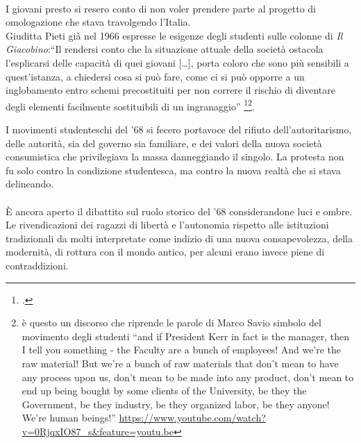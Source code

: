 \paragraph{}I giovani presto si resero conto di non voler prendere parte al progetto di omologazione che stava travolgendo l'Italia.
\\Giuditta Pieti già nel 1966 espresse le esigenze degli studenti sulle colonne di \textit{Il Giacobino}:\enquote{Il rendersi conto che la situazione attuale della società ostacola l’esplicarsi delle capacità di quei giovani […], porta coloro che sono più sensibili a quest'istanza, a chiedersi cosa si può fare, come ci si può opporre a un inglobamento entro schemi precostituiti per non correre il rischio di diventare degli elementi facilmente sostituibili di un ingranaggio} \footcite{Pieti}\footnote{è questo un discorso che riprende le parole di Marco Savio simbolo del movimento degli studenti \enquote{and if President Kerr in fact is the manager, then I tell you something - the Faculty are a bunch of employees! And we're the raw material! But we're a bunch of raw materials that don't mean to have any process upon us, don't mean to be made into any product, don't mean to end up being bought by some clients of the University, be they the Government, be they industry, be they organized labor, be they anyone! We're human beings!} \url{ https://www.youtube.com/watch?v=0RjqxIO87_s&feature=youtu.be}}.

I movimenti studenteschi del '68 si fecero portavoce del rifiuto dell'autoritarismo, delle autorità, sia del governo sia familiare, e dei valori della nuova società consumistica che privilegiava la massa danneggiando il singolo.
La protesta non fu solo contro la condizione studentesca, ma contro la nuova realtà che si stava delineando.

\paragraph{}È ancora aperto il dibattito sul ruolo storico del '68 considerandone luci e ombre. 
Le rivendicazioni dei ragazzi di libertà e l'autonomia rispetto alle istituzioni tradizionali da molti interpretate come indizio di una nuova consapevolezza, della modernità, di rottura con il mondo antico, per alcuni erano invece piene di contraddizioni.

